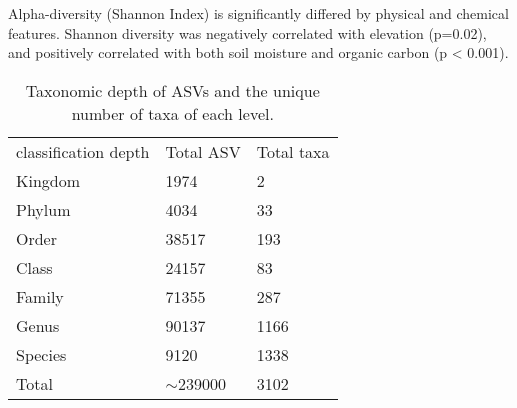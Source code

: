 Alpha-diversity (Shannon Index) is significantly differed by physical and chemical features.
Shannon diversity was negatively correlated with elevation (p=0.02), and
positively correlated with both soil moisture and organic carbon (p < 0.001).

\begin{table}[]
    \caption{Taxonomic depth of ASVs and the unique number of taxa of each level.\label{table:asv_taxonomy}}%
\begin{tabular}{@{}lll@{}}
classification depth & Total ASV    & Total taxa \\
Kingdom              & 1974         & 2          \\
Phylum               & 4034         & 33         \\
Order                & 38517        & 193        \\
Class                & 24157        & 83         \\
Family               & 71355        & 287        \\
Genus                & 90137        & 1166       \\
Species              & 9120         & 1338       \\
Total                & $\sim$239000 & 3102      
\end{tabular}
\label{table:asv_taxonomy}
\end{table}


